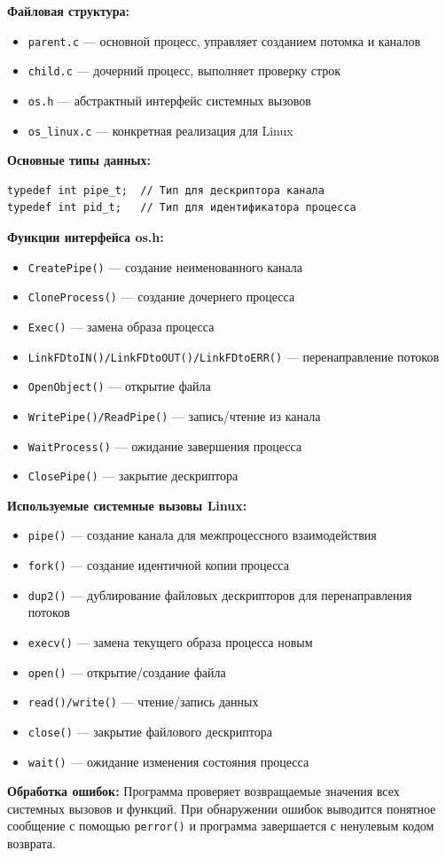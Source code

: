 {\bfseries Файловая структура:}
\begin{itemize}
    \item \texttt{parent.c} — основной процесс, управляет созданием потомка и каналов
    \item \texttt{child.c} — дочерний процесс, выполняет проверку строк
    \item \texttt{os.h} — абстрактный интерфейс системных вызовов
    \item \texttt{os\_linux.c} — конкретная реализация для Linux
\end{itemize}

{\bfseries Основные типы данных:}
\begin{verbatim}
typedef int pipe_t;  // Тип для дескриптора канала
typedef int pid_t;   // Тип для идентификатора процесса
\end{verbatim}

{\bfseries Функции интерфейса os.h:}
\begin{itemize}
    \item \texttt{CreatePipe()} — создание неименованного канала
    \item \texttt{CloneProcess()} — создание дочернего процесса
    \item \texttt{Exec()} — замена образа процесса
    \item \texttt{LinkFDtoIN()/LinkFDtoOUT()/LinkFDtoERR()} — перенаправление потоков
    \item \texttt{OpenObject()} — открытие файла
    \item \texttt{WritePipe()/ReadPipe()} — запись/чтение из канала
    \item \texttt{WaitProcess()} — ожидание завершения процесса
    \item \texttt{ClosePipe()} — закрытие дескриптора
\end{itemize}

{\bfseries Используемые системные вызовы Linux:}
\begin{itemize}
    \item \texttt{pipe()} — создание канала для межпроцессного взаимодействия
    \item \texttt{fork()} — создание идентичной копии процесса
    \item \texttt{dup2()} — дублирование файловых дескрипторов для перенаправления потоков
    \item \texttt{execv()} — замена текущего образа процесса новым
    \item \texttt{open()} — открытие/создание файла
    \item \texttt{read()/write()} — чтение/запись данных
    \item \texttt{close()} — закрытие файлового дескриптора
    \item \texttt{wait()} — ожидание изменения состояния процесса
\end{itemize}

{\bfseries Обработка ошибок:}
Программа проверяет возвращаемые значения всех системных вызовов и функций. При обнаружении ошибок выводится понятное сообщение с помощью \texttt{perror()} и программа завершается с ненулевым кодом возврата.